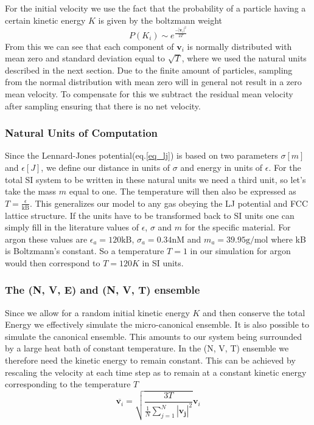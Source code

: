 \documentclass[twoside]{article}
\begin{document}
	For the initial velocity we use the fact that the probability of a particle having a certain kinetic energy $K$ is given by the boltzmann weight 
	\begin{equation}\label{eq_boltzmann}
	P(K_i) \sim e^{\frac{-|\mathbf{v}_i|^2}{2T}}
	\end{equation}
	From this we can see that each component of $\mathbf{v}_i$ is normally distributed with mean zero and standard deviation equal to $\sqrt{T}$, where we used the natural units described in the next section. Due to the finite amount of particles, sampling from the normal distribution with mean zero will in general not result in a zero mean velocity. To compensate for this we subtract the residual mean velocity after sampling ensuring that there is no net velocity.  
	
	
	\subsubsection*{Natural Units of Computation}
	Since the Lennard-Jones potential(eq.\ref{eq_lj}) is based on two parameters $\sigma [m]$ and $\epsilon [J]$, we define our distance in units of $\sigma$ and energy in units of $\epsilon$. For the total SI system to be written in these natural units we need a third unit, so let's take the mass $m$ equal to one. The temperature will then also be expressed as $T  = \frac{\epsilon}{\text{kB}}$. This generalizes our model to any gas obeying the LJ potential and FCC lattice structure. If the units have to be transformed back to SI units one can simply fill in the literature values of $\epsilon$, $\sigma$ and $m$ for the specific material. For argon these values are $\epsilon_a = 120 \text{kB}$, $\sigma_a = 0.34 \text{nM}$ and $m_a = 39.95 \text{g/mol}$ where kB is Boltzmann's constant. So a temperature $T = 1$ in our simulation for argon would then correspond to $T = 120 K$ in SI units.
	
	\subsubsection*{The (N, V, E) and (N, V, T) ensemble}
	Since we allow for a random initial kinetic energy $K$ and then conserve the total Energy we effectively simulate the micro-canonical ensemble. It is also possible to simulate the canonical ensemble. This amounts to our system being surrounded by a large heat bath of constant temperature. In the (N, V, T) ensemble we therefore need the kinetic energy to remain constant. This can be achieved by rescaling the velocity at each time step as to remain at a constant kinetic energy corresponding to the temperature $T$
	\begin{equation}\label{eq_vel_rescale}
	\overline{\mathbf{v}_i} = \sqrt{\frac{3 T}{\frac{1}{N} \sum_{j=1}^N |\mathbf{v_j}|^2}} \mathbf{v}_i
	\end{equation}
	
\end{document}
